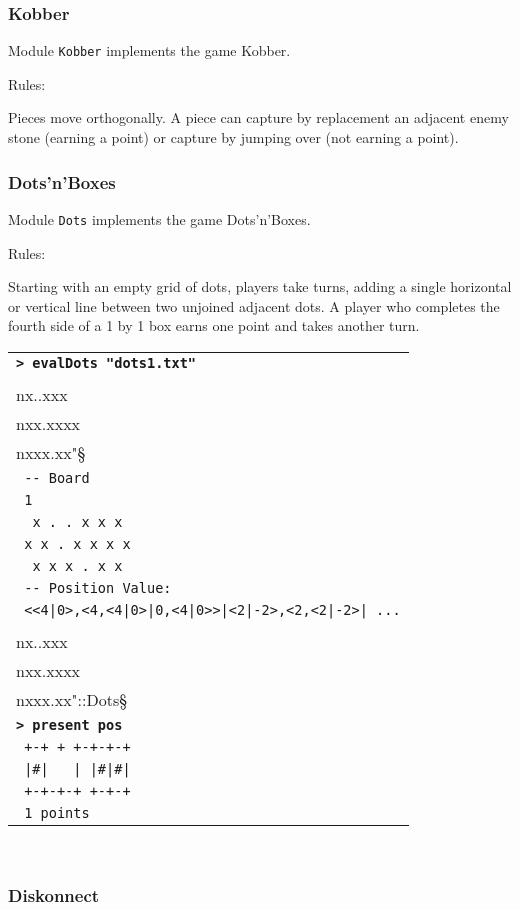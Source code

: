 \documentclass[a4paper,12pt]{article}
\newcommand{\bash}[1]{\small\textbf{\lstinline§> #1§}\\}
\newcommand{\out}[1]{\small\lstinline§ #1§}
\newcommand{\haskellCode}{\fontfamily{pcr}\selectfont}
\newenvironment{sgcode}
	{ \haskellCode
	  \begin{tabular}{|p{0.9\textwidth}|}
      \hline	
	}
	{ \\\hline  
      \end{tabular} \\
	  \par 
	}
\begin{document}
\subsubsection{Kobber}

Module \verb|Kobber| implements the game Kobber.

Rules:

Pieces move orthogonally. 
A piece can capture by replacement an adjacent enemy stone (earning a point) or 
capture by jumping over (not earning a point).

\subsubsection{Dots'n'Boxes}

Module \verb|Dots| implements the game Dots'n'Boxes.

Rules:

Starting with an empty grid of dots, players take turns, adding a single horizontal 
or vertical line between two unjoined adjacent dots. A player who completes the 
fourth side of a 1 by 1 box earns one point and takes another turn. 

\begin{sgcode}
\bash{evalDots "dots1.txt"}
\out{-- Read: "1\\nx..xxx\\nxx.xxxx\\nxxx.xx"} \\
\out{-- Board} \\
\out{1} \\
\verb§  x . . x x x § \\
\verb§ x x . x x x x§ \\
\verb§  x x x . x x § \\
\out{-- Position Value:} \\
\out{<<4|0>,<4,<4|0>|0,<4|0>>|<2|-2>,<2,<2|-2>| ...} \\
\bash{let pos = fromRaw "1\\nx..xxx\\nxx.xxxx\\nxxx.xx"::Dots}
\bash{present pos}
\verb§ +-+ + +-+-+-+§ \\
\verb§ |#|   | |#|#|§ \\
\verb§ +-+-+-+ +-+-+§ \\
\out{1 points}
\end{sgcode}

\subsubsection{Diskonnect}
\end{document}

